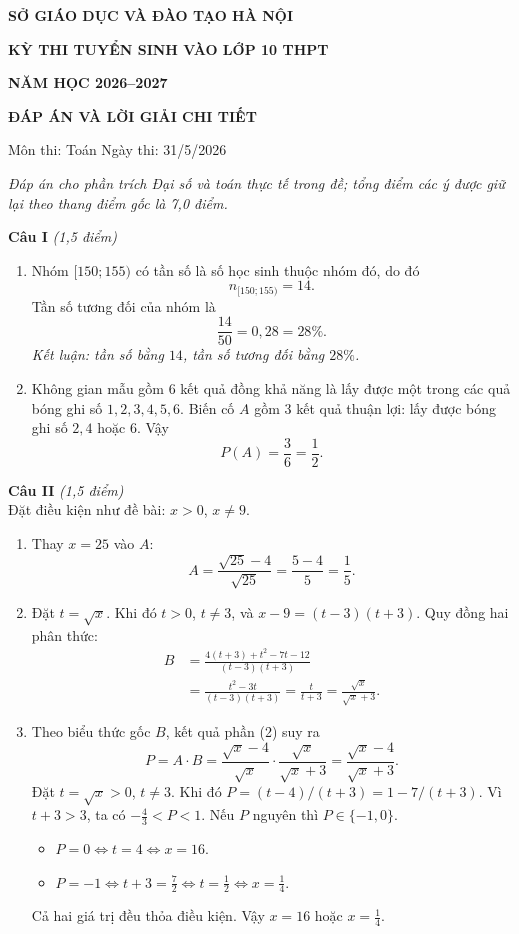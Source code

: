 \documentclass[12pt,a4paper]{article}
\newcommand{\diem}[1]{\textit{(#1 điểm)}}
\begin{document}
\begin{center}
  {\large\bfseries SỞ GIÁO DỤC VÀ ĐÀO TẠO HÀ NỘI}\par
  {\Large\bfseries KỲ THI TUYỂN SINH VÀO LỚP 10 THPT}\par
  {\large\bfseries NĂM HỌC 2026--2027}\par
  \vspace{0.35em}
  {\large\bfseries ĐÁP ÁN VÀ LỜI GIẢI CHI TIẾT}\par
  Môn thi: Toán \qquad Ngày thi: 31/5/2026
\end{center}
\textit{Đáp án cho phần trích Đại số và toán thực tế trong đề; tổng điểm các ý được giữ lại theo thang điểm gốc là 7,0 điểm.}

\textbf{Câu I} \diem{1,5}
\begin{enumerate}
  \item Nhóm $[150;155)$ có tần số là số học sinh thuộc nhóm đó, do đó
  \[
    n_{[150;155)}=14.
  \]
  Tần số tương đối của nhóm là
  \[
    \frac{14}{50}=0{,}28=28\%.
  \]
  \textit{Kết luận: tần số bằng $14$, tần số tương đối bằng $28\%$.}

  \item Không gian mẫu gồm 6 kết quả đồng khả năng là lấy được một trong các quả bóng ghi số $1,2,3,4,5,6$. Biến cố $A$ gồm 3 kết quả thuận lợi: lấy được bóng ghi số $2,4$ hoặc $6$. Vậy
  \[
    P(A)=\frac{3}{6}=\frac12.
  \]
\end{enumerate}

\textbf{Câu II} \diem{1,5}\\
Đặt điều kiện như đề bài: $x>0$, $x\ne9$.
\begin{enumerate}
  \item Thay $x=25$ vào $A$:
  \[
    A=\frac{\sqrt{25}-4}{\sqrt{25}}=\frac{5-4}{5}=\frac15.
  \]

  \item Đặt $t=\sqrt{x}$. Khi đó $t>0$, $t\ne3$, và $x-9=(t-3)(t+3)$. Quy đồng hai phân thức:
  \begin{align*}
    B&=\frac{4(t+3)+t^2-7t-12}{(t-3)(t+3)}\\
     &=\frac{t^2-3t}{(t-3)(t+3)}
      =\frac{t}{t+3}
      =\frac{\sqrt{x}}{\sqrt{x}+3}.
  \end{align*}

  \item Theo biểu thức gốc $B$, kết quả phần (2) suy ra
  \[
    P=A\cdot B=\frac{\sqrt{x}-4}{\sqrt{x}}\cdot\frac{\sqrt{x}}{\sqrt{x}+3}
      =\frac{\sqrt{x}-4}{\sqrt{x}+3}.
  \]
  Đặt $t=\sqrt{x}>0$, $t\ne3$. Khi đó $P=(t-4)/(t+3)=1-7/(t+3)$. Vì $t+3>3$, ta có $-\frac43<P<1$. Nếu $P$ nguyên thì $P\in\{-1,0\}$.
  \begin{itemize}
    \item $P=0\iff t=4\iff x=16$.
    \item $P=-1\iff t+3=\frac72\iff t=\frac12\iff x=\frac14$.
  \end{itemize}
  Cả hai giá trị đều thỏa điều kiện. Vậy $x=16$ hoặc $x=\frac14$.
\end{enumerate}
\end{document}

